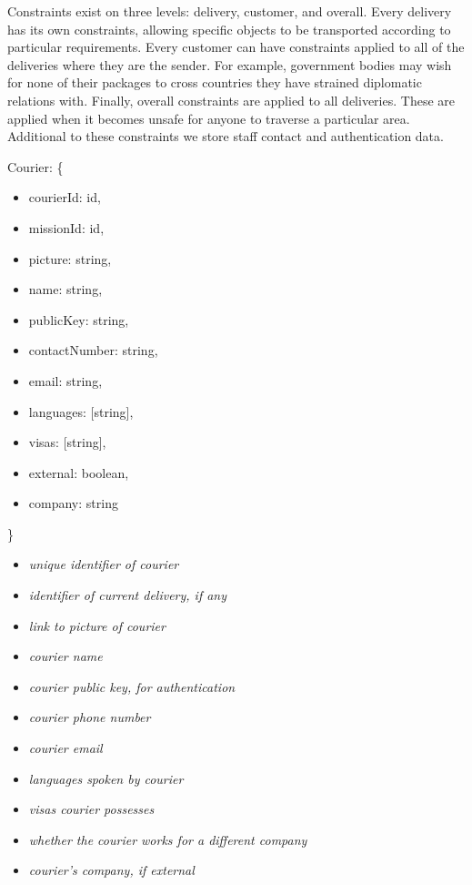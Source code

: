 Constraints exist on three levels: delivery, customer, and overall. Every delivery has its own constraints, allowing specific objects to be transported according to particular requirements. Every customer can have constraints applied to all of the deliveries where they are the sender. For example, government bodies may wish for none of their packages to cross countries they have strained diplomatic relations with. Finally, overall constraints are applied to all deliveries. These are applied when it becomes unsafe for anyone to traverse a particular area. Additional to these constraints we store staff contact and authentication data.

\begin{minipage}{6.5cm}
    Courier: \{
    \begin{itemize}
        \itemsep-0.5em
        \item[] courierId: id,
        \item[] missionId: id,
        \item[] picture: string,
        \item[] name: string,
        \item[] publicKey: string,
        \item[] contactNumber: string,
        \item[] email: string,
        \item[] languages: [string],
        \item[] visas: [string],
        \item[] external: boolean,
        \item[] company: string
    \end{itemize}
    \}
\end{minipage}
\begin{minipage}{10cm}
    \hspace{1cm}
    \begin{itemize}
        \itemsep-0.5em
        \item[] \textit{unique identifier of courier}
        \item[] \textit{identifier of current delivery, if any}
        \item[] \textit{link to picture of courier}
        \item[] \textit{courier name}
        \item[] \textit{courier public key, for authentication}
        \item[] \textit{courier phone number}
        \item[] \textit{courier email}
        \item[] \textit{languages spoken by courier}
        \item[] \textit{visas courier possesses}
        \item[] \textit{whether the courier works for a different company}
        \item[] \textit{courier's company, if external}
    \end{itemize}
    \hspace{1cm}
\end{minipage}

